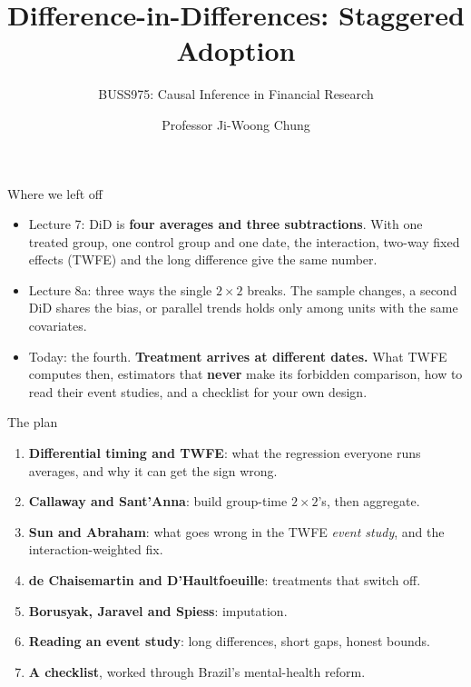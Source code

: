 \documentclass[
  11pt,
  ignorenonframetext,
  aspectratio=169,
]{beamer}
\title{\texorpdfstring{Difference-in-Differences: Staggered
Adoption}{Difference-in-Differences: Staggered Adoption}}
\subtitle{\texorpdfstring{BUSS975: Causal Inference in Financial
Research}{BUSS975: Causal Inference in Financial Research}}
\author{Professor Ji-Woong Chung}
\date{}
\institute{Korea University}
\providecommand{\tightlist}{%
  \setlength{\itemsep}{0pt}\setlength{\parskip}{0pt}}
\begin{document}
\frame{\titlepage}


\begin{frame}{Where we left off}
\protect{}\label{where-we-left-off}
\begin{itemize}
\tightlist
\item
  Lecture 7: DiD is \textbf{four averages and three subtractions}. With
  one treated group, one control group and one date, the interaction,
  two-way fixed effects (TWFE) and the long difference give the same
  number.
\item
  Lecture 8a: three ways the single \(2 \times 2\) breaks. The sample
  changes, a second DiD shares the bias, or parallel trends holds only
  among units with the same covariates.
\end{itemize}

\vspace{0.4em}

\begin{itemize}
\tightlist
\item
  Today: the fourth. \textbf{Treatment arrives at different dates.} What
  TWFE computes then, estimators that \textbf{never} make its forbidden
  comparison, how to read their event studies, and a checklist for your
  own design.
\end{itemize}
\end{frame}

\begin{frame}{The plan}
\protect{}\label{the-plan}
\begin{enumerate}
\tightlist
\item
  \textbf{Differential timing and TWFE}: what the regression everyone
  runs averages, and why it can get the sign wrong.
\item
  \textbf{Callaway and Sant'Anna}: build group-time \(2 \times 2\)'s,
  then aggregate.
\item
  \textbf{Sun and Abraham}: what goes wrong in the TWFE \emph{event
  study}, and the interaction-weighted fix.
\item
  \textbf{de Chaisemartin and D'Haultfoeuille}: treatments that switch
  off.
\item
  \textbf{Borusyak, Jaravel and Spiess}: imputation.
\item
  \textbf{Reading an event study}: long differences, short gaps, honest
  bounds.
\item
  \textbf{A checklist}, worked through Brazil's mental-health reform.
\end{enumerate}

\vspace{0.4em}
\end{frame}
\end{document}
